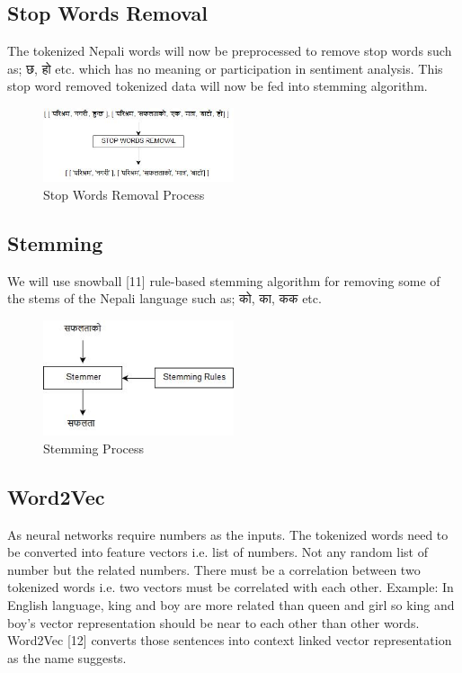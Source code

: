             \subsection{Stop Words Removal}
The tokenized Nepali words will now be preprocessed to remove stop words such as;
छ, हो etc. which has no meaning or participation in sentiment analysis. This stop word
removed tokenized data will now be fed into stemming algorithm.
        \begin{figure}[hbt!]
            \centering
                \includegraphics[width=0.5\textwidth]{./img/6.6.jpg}
                \caption{Stop Words Removal Process}
        \end{figure}                    \subsection{Stemming}
We will use snowball
[11]
rule-based stemming algorithm for removing some of the
stems of the Nepali language such as; को, का, कक etc.
        \begin{figure}[hbt!]
            \centering
                \includegraphics[width=0.5\textwidth]{./img/6.7.jpg}
                \caption{Stemming Process}
        \end{figure}
            \subsection{Word2Vec}
As neural networks require numbers as the inputs. The tokenized words need to be
converted into feature vectors i.e. list of numbers. Not any random list of number but
the related numbers. There must be a correlation between two tokenized words i.e. two
vectors must be correlated with each other. Example: In English language, king and
boy are more related than queen and girl so king and boy’s vector representation should
be near to each other than other words. Word2Vec
[12]
converts those sentences into
context linked vector representation as the name suggests.
